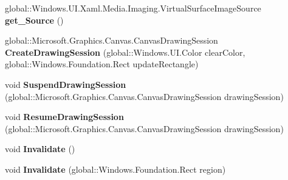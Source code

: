 \begin{DoxyCompactItemize}
global\+::\+Windows.\+U\+I.\+Xaml.\+Media.\+Imaging.\+Virtual\+Surface\+Image\+Source {\bfseries get\+\_\+\+Source} ()
\item 
\mbox{\label{class_microsoft_1_1_graphics_1_1_canvas_1_1_u_i_1_1_xaml_1_1_canvas_virtual_image_source_a751435fc921134c60f5373dd117a62da}} 
global\+::\+Microsoft.\+Graphics.\+Canvas.\+Canvas\+Drawing\+Session {\bfseries Create\+Drawing\+Session} (global\+::\+Windows.\+U\+I.\+Color clear\+Color, global\+::\+Windows.\+Foundation.\+Rect update\+Rectangle)
\item 
\mbox{\label{class_microsoft_1_1_graphics_1_1_canvas_1_1_u_i_1_1_xaml_1_1_canvas_virtual_image_source_aeec022e7d81700c461e1f6c2d1d80ecd}} 
void {\bfseries Suspend\+Drawing\+Session} (global\+::\+Microsoft.\+Graphics.\+Canvas.\+Canvas\+Drawing\+Session drawing\+Session)
\item 
\mbox{\label{class_microsoft_1_1_graphics_1_1_canvas_1_1_u_i_1_1_xaml_1_1_canvas_virtual_image_source_a97dd6bba6fd9c0fea9bc567785cb2e43}} 
void {\bfseries Resume\+Drawing\+Session} (global\+::\+Microsoft.\+Graphics.\+Canvas.\+Canvas\+Drawing\+Session drawing\+Session)
\item 
\mbox{\label{class_microsoft_1_1_graphics_1_1_canvas_1_1_u_i_1_1_xaml_1_1_canvas_virtual_image_source_a36a7e3ba8102ce00721b07b902b1f964}} 
void {\bfseries Invalidate} ()
\item 
\mbox{\label{class_microsoft_1_1_graphics_1_1_canvas_1_1_u_i_1_1_xaml_1_1_canvas_virtual_image_source_a9e05f0718686f31ebe81c8b975a09ecd}} 
void {\bfseries Invalidate} (global\+::\+Windows.\+Foundation.\+Rect region)
\item 
\mbox{\label{class_microsoft_1_1_graphics_1_1_canvas_1_1_u_i_1_1_xaml_1_1_canvas_virtual_image_source_acd73537ab914ef14e5e244675ca193a1}} 

\end{DoxyCompactItemize}
